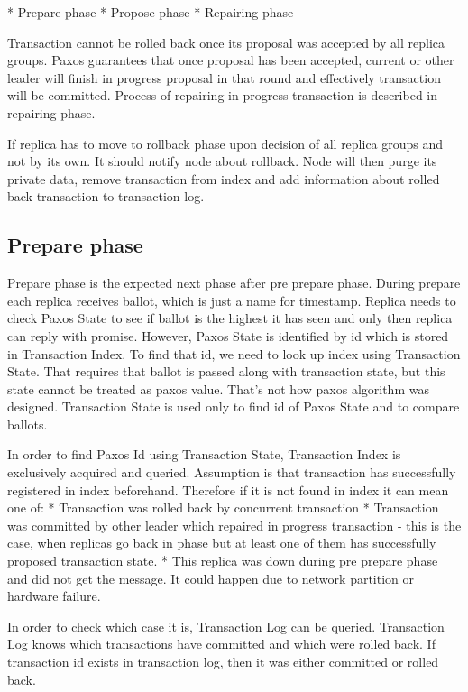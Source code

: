 * Prepare phase
* Propose phase
* Repairing phase


Transaction cannot be rolled back once its proposal was accepted by all replica groups. Paxos guarantees that once proposal has been accepted, current or other leader will finish in progress proposal in that round and effectively transaction will be committed. Process of repairing in progress transaction is described in repairing phase.


If replica has to move to rollback phase upon decision of all replica groups and not by its own. It should notify node about rollback. Node will then purge its private data, remove transaction from index and add information about rolled back transaction to transaction log.


\subsection{Prepare phase}
Prepare phase is the expected next phase after pre prepare phase. During prepare each replica receives ballot, which is just a name for timestamp. Replica needs to check Paxos State to see if ballot is the highest it has seen and only then replica can reply with promise. However, Paxos State is identified by id which is stored in Transaction Index. To find that id, we need to look up index using Transaction State. That requires that ballot is passed along with transaction state, but this state cannot be treated as paxos value. That’s not how paxos algorithm was designed. Transaction State is used only to find id of Paxos State and to compare ballots.


In order to find Paxos Id using Transaction State, Transaction Index is exclusively acquired and queried. Assumption is that transaction has successfully registered in index beforehand. Therefore if it is not found in index it can mean one of:
* Transaction was rolled back by concurrent transaction
* Transaction was committed by other leader which repaired in progress transaction - this is the case, when replicas go back in phase but at least one of them has successfully proposed transaction state.
* This replica was down during pre prepare phase and did not get the message. It could happen due to network partition or hardware failure.


In order to check which case it is, Transaction Log can be queried. Transaction Log knows which transactions have committed and which were rolled back. If transaction id exists in transaction log, then it was either committed or rolled back.


